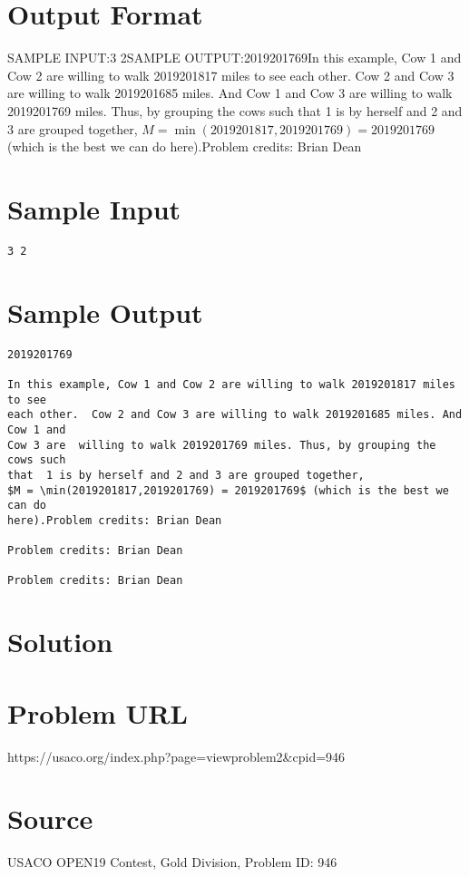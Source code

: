 \documentclass[12pt]{article}
\begin{document}
\section*{Output Format}
SAMPLE INPUT:3 2SAMPLE OUTPUT:2019201769In this example, Cow 1 and Cow 2 are willing to walk 2019201817 miles to see
each other.  Cow 2 and Cow 3 are willing to walk 2019201685 miles. And Cow 1 and
Cow 3 are  willing to walk 2019201769 miles. Thus, by grouping the cows such
that  1 is by herself and 2 and 3 are grouped together,
$M = \min(2019201817,2019201769) = 2019201769$ (which is the best we can do
here).Problem credits: Brian Dean

\section*{Sample Input}
\begin{verbatim}
3 2
\end{verbatim}

\section*{Sample Output}
\begin{verbatim}
2019201769

In this example, Cow 1 and Cow 2 are willing to walk 2019201817 miles to see
each other.  Cow 2 and Cow 3 are willing to walk 2019201685 miles. And Cow 1 and
Cow 3 are  willing to walk 2019201769 miles. Thus, by grouping the cows such
that  1 is by herself and 2 and 3 are grouped together,
$M = \min(2019201817,2019201769) = 2019201769$ (which is the best we can do
here).Problem credits: Brian Dean

Problem credits: Brian Dean

Problem credits: Brian Dean
\end{verbatim}

\section*{Solution}


\section*{Problem URL}
https://usaco.org/index.php?page=viewproblem2&cpid=946

\section*{Source}
USACO OPEN19 Contest, Gold Division, Problem ID: 946
\end{document}
